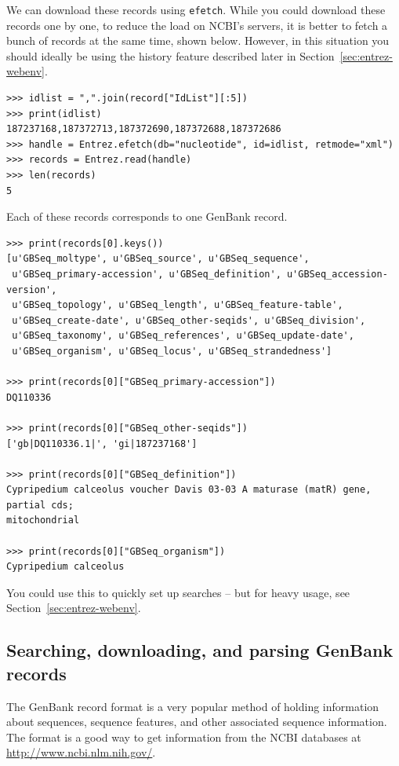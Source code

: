\documentclass{report}
\begin{document}
\label{sec:entrez-batched-efetch}
We can download these records using \verb+efetch+.
While you could download these records one by one, to reduce the load on NCBI's servers, it is better to fetch a bunch of records at the same time, shown below.
However, in this situation you should ideally be using the history feature described later in Section~\ref{sec:entrez-webenv}.

\begin{verbatim}
>>> idlist = ",".join(record["IdList"][:5])
>>> print(idlist)
187237168,187372713,187372690,187372688,187372686
>>> handle = Entrez.efetch(db="nucleotide", id=idlist, retmode="xml")
>>> records = Entrez.read(handle)
>>> len(records)
5
\end{verbatim}
Each of these records corresponds to one GenBank record.
\begin{verbatim}
>>> print(records[0].keys())
[u'GBSeq_moltype', u'GBSeq_source', u'GBSeq_sequence',
 u'GBSeq_primary-accession', u'GBSeq_definition', u'GBSeq_accession-version',
 u'GBSeq_topology', u'GBSeq_length', u'GBSeq_feature-table',
 u'GBSeq_create-date', u'GBSeq_other-seqids', u'GBSeq_division',
 u'GBSeq_taxonomy', u'GBSeq_references', u'GBSeq_update-date',
 u'GBSeq_organism', u'GBSeq_locus', u'GBSeq_strandedness']

>>> print(records[0]["GBSeq_primary-accession"])
DQ110336

>>> print(records[0]["GBSeq_other-seqids"])
['gb|DQ110336.1|', 'gi|187237168']

>>> print(records[0]["GBSeq_definition"])
Cypripedium calceolus voucher Davis 03-03 A maturase (matR) gene, partial cds;
mitochondrial

>>> print(records[0]["GBSeq_organism"])
Cypripedium calceolus
\end{verbatim}

You could use this to quickly set up searches -- but for heavy usage, see Section~\ref{sec:entrez-webenv}.

\subsection{Searching, downloading, and parsing GenBank records}
\label{sec:entrez-search-fetch-genbank}

The GenBank record format is a very popular method of holding information about sequences, sequence features, and other associated sequence information. The format is a good way to get information from the NCBI databases at \url{http://www.ncbi.nlm.nih.gov/}.
\end{document}

